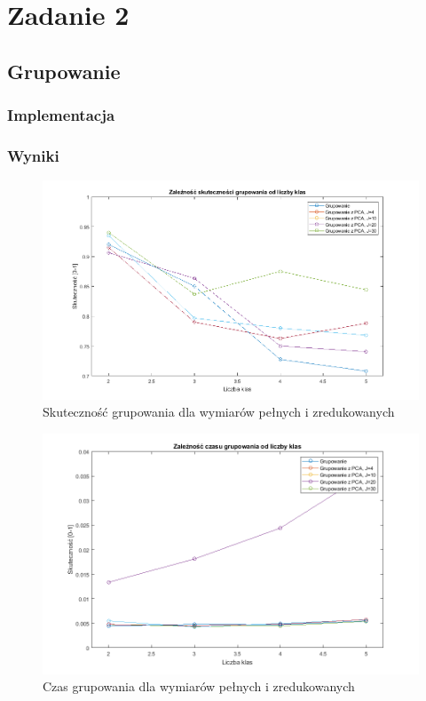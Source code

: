 \section{Zadanie 2}

\subsection{Grupowanie}

\subsubsection{Implementacja}

\subsubsection{Wyniki}

\begin{figure}[H]
	\centering
	\hspace*{-0.8in}
	\includegraphics[scale = 0.7]{img/acc_from_classes_group.png}
	\caption{Skuteczność grupowania dla wymiarów pełnych i zredukowanych}  
	\label{rys:acc_from_classes_group} 
\end{figure}

\begin{figure}[H]
	\centering
	\hspace*{-0.8in}
	\includegraphics[scale = 0.7]{img/time_from_classes_group.png}
	\caption{Czas grupowania dla wymiarów pełnych i zredukowanych}  
	\label{rys:time_from_classes_group} 
\end{figure}


